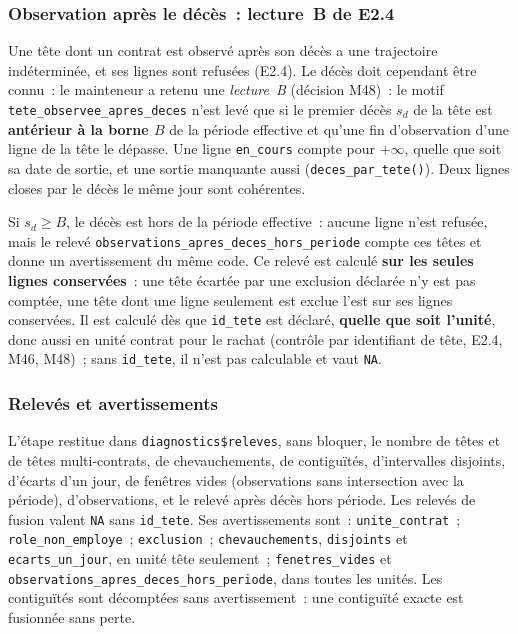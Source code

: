 \documentclass[a4paper,11pt]{article}
\newcommand{\code}[1]{\texttt{\small #1}}
\begin{document}
\subsubsection*{Observation après le décès~: lecture~B de E2.4}

Une tête dont un contrat est observé après son décès a une trajectoire
indéterminée, et ses lignes sont refusées (E2.4). Le décès doit cependant être
connu~: le mainteneur a retenu une \emph{lecture~B} (décision M48)~: le motif
\code{tete\_observee\_apres\_deces} n'est levé que si le premier décès $s_d$ de
la tête est \textbf{antérieur à la borne $B$} de la période effective et qu'une
fin d'observation d'une ligne de la tête le dépasse. Une ligne \code{en\_cours}
compte pour $+\infty$, quelle que soit sa date de sortie, et une sortie
manquante aussi (\code{deces\_par\_tete()}). Deux lignes closes par le décès le
même jour sont cohérentes.

\medskip
Si $s_d \ge B$, le décès est hors de la période effective~: aucune ligne n'est
refusée, mais le relevé \code{observations\_apres\_deces\_hors\_periode}
compte ces têtes et donne un avertissement du même code. Ce relevé est calculé
\textbf{sur les seules lignes conservées}~: une tête écartée par une exclusion
déclarée n'y est pas comptée, une tête dont une ligne seulement est exclue
l'est sur ses lignes conservées. Il est calculé dès que \code{id\_tete} est
déclaré, \textbf{quelle que soit l'unité}, donc aussi en unité contrat pour le
rachat (contrôle par identifiant de tête, E2.4, M46, M48)~; sans
\code{id\_tete}, il n'est pas calculable et vaut \code{NA}.

\subsubsection*{Relevés et avertissements}

L'étape restitue dans \code{diagnostics\$releves}, sans bloquer, le nombre de
têtes et de têtes multi-contrats, de chevauchements, de contiguïtés,
d'intervalles disjoints, d'écarts d'un jour, de fenêtres vides (observations
sans intersection avec la période), d'observations, et le relevé après décès
hors période. Les relevés de fusion valent \code{NA} sans \code{id\_tete}. Ses
avertissements sont~: \code{unite\_contrat}~; \code{role\_non\_employe}~;
\code{exclusion}~; \code{chevauchements}, \code{disjoints} et
\code{ecarts\_un\_jour}, en unité tête seulement~; \code{fenetres\_vides} et
\code{observations\_apres\_deces\_hors\_periode}, dans toutes les unités. Les
contiguïtés sont décomptées sans avertissement~: une contiguïté exacte est
fusionnée sans perte.
\end{document}
